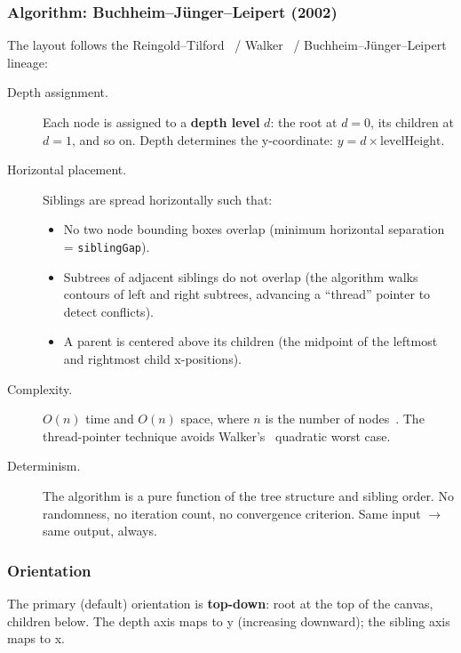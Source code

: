 \subsubsection{Algorithm: Buchheim--J{\"u}nger--Leipert (2002)}

The layout follows the Reingold--Tilford~\cite{reingold1981} / Walker~\cite{walker1990} / Buchheim--J{\"u}nger--Leipert~\cite{buchheim2002} lineage:

\begin{description}
  \item[Depth assignment.] Each node is assigned to a \textbf{depth level} $d$: the root at $d=0$, its children at $d=1$, and so on. Depth determines the y-coordinate: $y = d \times \text{levelHeight}$.
  
  \item[Horizontal placement.] Siblings are spread horizontally such that:
  \begin{itemize}
    \item No two node bounding boxes overlap (minimum horizontal separation = \texttt{siblingGap}).
    \item Subtrees of adjacent siblings do not overlap (the algorithm walks contours of left and right subtrees, advancing a ``thread'' pointer to detect conflicts).
    \item A parent is centered above its children (the midpoint of the leftmost and rightmost child x-positions).
  \end{itemize}
  
  \item[Complexity.] $O(n)$ time and $O(n)$ space, where $n$ is the number of nodes~\cite{buchheim2002}. The thread-pointer technique avoids Walker's~\cite{walker1990} quadratic worst case.
  
  \item[Determinism.] The algorithm is a pure function of the tree structure and sibling order. No randomness, no iteration count, no convergence criterion. Same input $\rightarrow$ same output, always.
\end{description}

\subsubsection{Orientation}

The primary (default) orientation is \textbf{top-down}: root at the top of the canvas, children below. The depth axis maps to y (increasing downward); the sibling axis maps to x.

